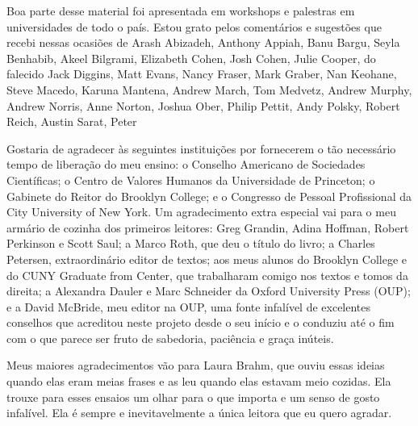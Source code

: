  \par 
Boa parte desse material foi apresentada em workshops e palestras em universidades de todo o país. Estou grato pelos comentários e sugestões que recebi nessas ocasiões de Arash Abizadeh, Anthony Appiah, Banu Bargu, Seyla Benhabib, Akeel Bilgrami, Elizabeth Cohen, Josh Cohen, Julie Cooper, do falecido Jack Diggins, Matt Evans, Nancy Fraser, Mark Graber, Nan Keohane, Steve Macedo, Karuna Mantena, Andrew March, Tom Medvetz, Andrew Murphy, Andrew Norris, Anne Norton, Joshua Ober, Philip Pettit, Andy Polsky, Robert Reich, Austin Sarat, Peter
 \par 
Gostaria de agradecer às seguintes instituições por fornecerem o tão necessário tempo de liberação do meu ensino: o Conselho Americano de Sociedades Científicas; o Centro de Valores Humanos da Universidade de Princeton; o Gabinete do Reitor do Brooklyn College; e o Congresso de Pessoal Profissional da City University of New York. Um agradecimento extra especial vai para o meu armário de cozinha dos primeiros leitores: Greg Grandin, Adina Hoffman, Robert Perkinson e Scott Saul; a Marco Roth, que deu o título do livro; a Charles Petersen, extraordinário editor de textos; aos meus alunos do Brooklyn College e do CUNY Graduate from Center, que trabalharam comigo nos textos e tomos da direita; a Alexandra Dauler e Marc Schneider da Oxford University Press (OUP); e a David McBride, meu editor na OUP, uma fonte infalível de excelentes conselhos que acreditou neste projeto desde o seu início e o conduziu até o fim com o que parece ser fruto de sabedoria, paciência e graça inúteis.
 \par 
Meus maiores agradecimentos vão para Laura Brahm, que ouviu essas ideias quando elas eram meias frases e as leu quando elas estavam meio cozidas. Ela trouxe para esses ensaios um olhar para o que importa e um senso de gosto infalível. Ela é sempre e inevitavelmente a única leitora que eu quero agradar.